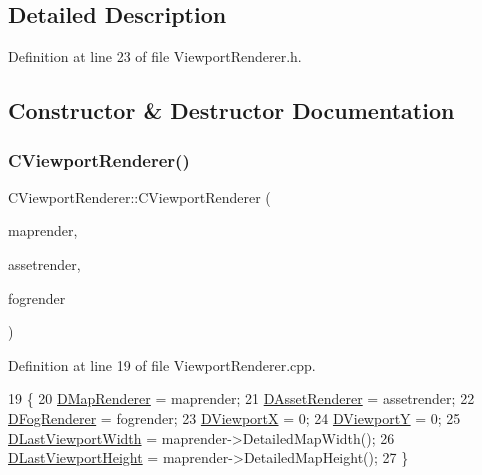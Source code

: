 \subsection{Detailed Description}


Definition at line 23 of file Viewport\+Renderer.\+h.



\subsection{Constructor \& Destructor Documentation}
\hypertarget{classCViewportRenderer_a21067af3982b3e7468e3770c50a7c6a0}{}\label{classCViewportRenderer_a21067af3982b3e7468e3770c50a7c6a0} 
\subsubsection{\texorpdfstring{C\+Viewport\+Renderer()}{CViewportRenderer()}}
{\footnotesize\ttfamily C\+Viewport\+Renderer\+::\+C\+Viewport\+Renderer (\begin{DoxyParamCaption}\item[{std\+::shared\+\_\+ptr$<$ \hyperlink{classCMapRenderer}{C\+Map\+Renderer} $>$}]{maprender,  }\item[{std\+::shared\+\_\+ptr$<$ \hyperlink{classCAssetRenderer}{C\+Asset\+Renderer} $>$}]{assetrender,  }\item[{std\+::shared\+\_\+ptr$<$ \hyperlink{classCFogRenderer}{C\+Fog\+Renderer} $>$}]{fogrender }\end{DoxyParamCaption})}



Definition at line 19 of file Viewport\+Renderer.\+cpp.


\begin{DoxyCode}
19                                                                                                            
                                                            \{
20     \hyperlink{classCViewportRenderer_ac6bc7771bd6dcd35107d25bebb0c0a4c}{DMapRenderer} = maprender;
21     \hyperlink{classCViewportRenderer_a3daa075c87bbdde4d1ada41f0b98f4a8}{DAssetRenderer} = assetrender;
22     \hyperlink{classCViewportRenderer_a2fa9d183d00bdba4a2fea6d946992608}{DFogRenderer} = fogrender;
23     \hyperlink{classCViewportRenderer_aea9e05347f71a8e6b83439aab653be18}{DViewportX} = 0;
24     \hyperlink{classCViewportRenderer_ae13dd437a3da3d2bab16bc7ba61cb78f}{DViewportY} = 0;
25     \hyperlink{classCViewportRenderer_aaa21acd1b43badc3c1a3b0bf9b0f86f9}{DLastViewportWidth} = maprender->DetailedMapWidth();
26     \hyperlink{classCViewportRenderer_aaca5c330615fc2aacc57dede8e7c18b0}{DLastViewportHeight} = maprender->DetailedMapHeight();
27 \}
\end{DoxyCode}
\hypertarget{classCViewportRenderer_a88d046fb19e26d8d5f331e34aa86d598}{}\label{classCViewportRenderer_a88d046fb19e26d8d5f331e34aa86d598} 
